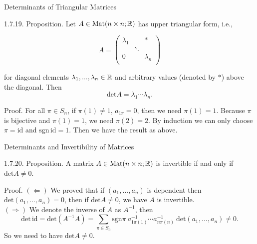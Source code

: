 \documentclass[hyperref={pdfpagelabels=true}]{beamer}
\newcommand{\Mat}{\text{Mat}}
\newcommand{\structb}[1]{\textcolor[rgb]{0.2,0.2,0.7}{#1}}
\newcommand{\<}{\langle}
\renewcommand{\>}{\rangle}
\begin{document}
    \begin{frame}{Determinants of Triangular Matrices}
        \begin{block}{1.7.19. Proposition.}
            Let $A \in \Mat(n \times n;\R)$ has upper triangular form, i.e.,
            \begin{spacing}{0.7}
            \[A = 
            \begin{pmatrix}
                \lambda_{1} & & * \\
                & \ddots & \\
                0 & & \lambda_{n}\\
            \end{pmatrix}
            \]
            \end{spacing}
            for diagonal elements $\lambda_{1},...,\lambda_{n} \in \mathbb{R}$ and arbitrary values (denoted by $*$) above the diagonal. Then
            \[\text{det}A = \lambda_{1} \cdots \lambda_{n}.\]
        \end{block}
        \begin{block}{Proof.}
            For all $\pi \in S_{n}$, if $\pi(1) \neq 1$, $a_{1\pi} = 0$, then we need $\pi(1) = 1$. Because $\pi$ is bijective and $\pi(1) = 1$, we need $\pi(2) = 2$. By induction we can only choose $\pi = \text{id}$ and $\text{sgn}\,\text{id} = 1$. Then we have the result as above.
        \end{block}
    \end{frame} 
    \begin{frame}{Determinants and Invertibility of Matrices}
        \begin{block}{1.7.20. Proposition.}
            A matrix $A \in \Mat(n \times n;\R)$ is invertible if and only if $\text{det}A \neq 0$.
        \end{block}
        \begin{block}{Proof.}
            \structb{$(\Leftarrow)$} We proved that if $(a_{1},...,a_{n})$ is dependent then $\text{det}(a_{1},...,a_{n}) = 0$, then if $\text{det}A \neq 0$, we have $A$ is invertible.\\
            \structb{$(\Rightarrow)$} We denote the inverse of $A$ as $A^{-1}$, then 
            \[\text{det}\,\text{id} = \text{det}(A^{-1}A) = \sum_{\pi \in S_{n}}\text{sgn}\pi\ a^{-1}_{1\pi(1)} \cdots a^{-1}_{n\pi(n)}\ \text{det}(a_{1},...,a_{n}) \neq 0.\]
            So we need to have $\text{det}A \neq 0$.
        \end{block}
    \end{frame}
\end{document}
